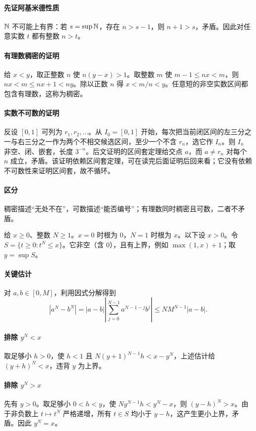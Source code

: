 \paragraph{先证阿基米德性质}$\mathbb{N}$ 不可能上有界：若 $s=\sup\mathbb{N}$，存在 $n>s-1$，则 $n+1>s$，矛盾。因此对任意实数 $t$ 都有整数 $n>t$。
\paragraph{有理数稠密的证明}给 $x<y$，取正整数 $n$ 使 $n(y-x)>1$。取整数 $m$ 使 $m-1\le nx<m$，则 $nx<m\le nx+1<ny$。除以正数 $n$ 得 $x<m/n<y$。任意短的非空实数区间都包含有理数，这称为稠密。
\paragraph{实数不可数的证明}反设 $[0,1]$ 可列为 $r_1,r_2,\ldots$。从 $I_0=[0,1]$ 开始，每次把当前闭区间的左三分之一与右三分之一作为两个不相交候选区间，至少一个不含 $r_n$，选它作 $I_n$。则 $I_n$ 非空、闭、嵌套，长度 $3^{-n}$。后文证明的区间套定理给交点 $a$，而 $a\not=r_n$ 对每个 $n$ 成立，矛盾。该证明依赖区间套定理，可在读完后面证明后回来看；它没有依赖不可数性来证明区间套，故不循环。
\paragraph{区分}稠密描述“无处不在”，可数描述“能否编号”；有理数同时稠密且可数，二者不矛盾。

给 $x\ge0$、整数 $N\ge1$。$x=0$ 时根为 $0$，$N=1$ 时根为 $x$。以下设 $x>0$。令 $S=\{t\ge0:t^N\le x\}$。它非空（含 $0$），且有上界，例如 $\max(1,x)+1$；取 $y=\sup S$。
\paragraph{关键估计}对 $a,b\in[0,M]$，利用因式分解得到
\[|a^N-b^N|=|a-b|\left|\sum_{j=0}^{N-1}a^{N-1-j}b^j\right|\le NM^{N-1}|a-b|.\]
\paragraph{排除 $y^N<x$}取足够小 $h>0$，使 $h<1$ 且 $N(y+1)^{N-1}h<x-y^N$，上述估计给 $(y+h)^N<x$，违背 $y$ 为上界。
\paragraph{排除 $y^N>x$}先有 $y>0$。取足够小 $0<h<y$，使 $Ny^{N-1}h<y^N-x$，则 $(y-h)^N>x$。由于非负数上 $t\mapsto t^N$ 严格递增，所有 $t\in S$ 均小于 $y-h$，这产生更小上界，矛盾。因此 $y^N=x$。
